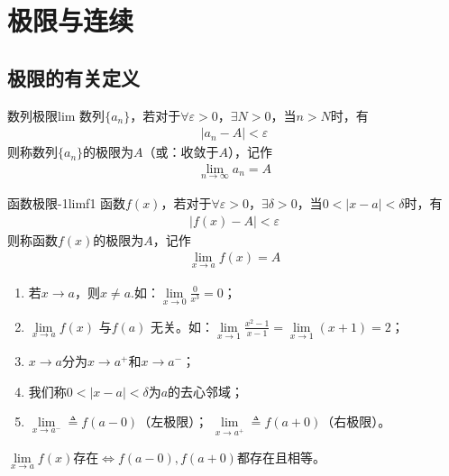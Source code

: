 \chapter{极限与连续}
\section{极限的有关定义}
\begin{definition}{数列极限}{lim}
数列$\{a_n\}$，若对于$ \forall\varepsilon>0 $，$ \exists N>0 $，当$ n>N $时，有
\begin{align}
    \vert{a_n-A}\vert<\varepsilon
\end{align}
则称数列$\{a_n\}$的极限为$A$（或：收敛于$A$），记作
\begin{align}
    \lim_{n\to \infty} a_n=A 
\end{align}
\end{definition}



\begin{definition}{函数极限-1}{limf1}
函数$f(x)$，若对于$ \forall\varepsilon>0 $，$ \exists \delta>0 $，当$ 0<\vert x-a\vert <\delta $时，有
\begin{align}
    \vert{f(x)-A}\vert<\varepsilon
\end{align}
则称函数$f(x)$的极限为$A$，记作
\begin{align}
    \lim_{x\to a} f(x)=A 
\end{align}
\end{definition}

\begin{note}
\begin{enumerate}
    \item 若$x \to a$，则$x\neq a$.如：$ \lim\limits_{x\to 0}\displaystyle\frac{0}{x^3}=0 $；
    \item $\lim\limits_{x \to a}f(x)$ 与$ f(a) $ 无关。如：$\lim\limits_{x \to 1}\displaystyle\frac{x^2-1}{x-1}=\lim\limits_{x \to 1}(x+1)=2$；
    \item $x \to a$分为$ x \to a^{+} $和$ x \to a^{-}$；
    \item 我们称$0<\vert x-a\vert <\delta$为$ a $的去心邻域；
    \item $\lim\limits_{x \to a^-}\triangleq f(a-0)$（左极限）；
    $\lim\limits_{x \to a^+}\triangleq f(a+0)$（右极限）。
\end{enumerate}
\end{note}

\FiveStar $\lim\limits_{x \to a} f(x)$存在$\iff f(a-0),f(a+0)$都存在且相等。

